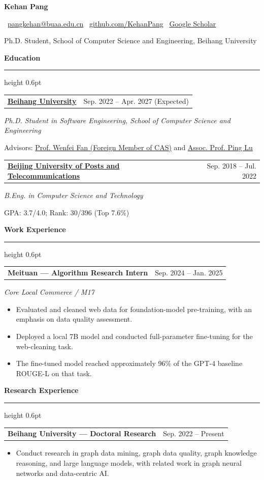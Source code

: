 \documentclass[10pt,a4paper]{article}
\makeatletter
\newcommand{\dateRange}[2]{\textcolor{muted}{#1 -- #2}}
\newcommand{\datedline}[2]{%
  \begin{tabularx}{\textwidth}{@{}Xr@{}}
    \textbf{#1} & #2
  \end{tabularx}\vspace{0.05em}
}
\newcommand{\logosection}[2]{%
  \vspace{0.7em}
  {\large\bfseries\color{heading}\makebox[1.35em][c]{#1}\hspace{0.25em}#2}\par
  \vspace{0.18em}
  {\color{rulecolor}\hrule height 0.6pt}
  \vspace{0.38em}
}
\newcommand{\roleline}[1]{\textit{#1}\par}
\makeatother
\begin{document}
\begin{center}
  {\fontsize{25}{29}\selectfont\bfseries\color{heading} Kehan Pang}\par
  \vspace{0.25em}
  {\small
    \faEnvelope\ \href{mailto:pangkehan@buaa.edu.cn}{pangkehan@buaa.edu.cn}
    \quad
    \faGithub\ \href{https://github.com/KehanPang}{github.com/KehanPang}
    \quad
    \faGraduationCap\ \href{https://scholar.google.com/citations?user=b3XVG_oAAAAJ}{Google Scholar}
  }\par
  \vspace{0.35em}
  Ph.D. Student, School of Computer Science and Engineering, Beihang University
\end{center}

\logosection{\faGraduationCap}{Education}

\datedline{\href{https://ev.buaa.edu.cn/}{Beihang University}}{\dateRange{Sep. 2022}{Apr. 2027 (Expected)}}
\roleline{Ph.D. Student in Software Engineering, School of Computer Science and Engineering}
Advisors: \href{https://cs.pku.edu.cn/info/1008/2707.htm}{Prof. Wenfei Fan (Foreign Member of CAS)} and
\href{https://scse.buaa.edu.cn/info/1388/10436.htm}{Assoc. Prof. Ping Lu}

\vspace{0.45em}
\datedline{\href{https://english.bupt.edu.cn/}{Beijing University of Posts and Telecommunications}}{\dateRange{Sep. 2018}{Jul. 2022}}
\roleline{B.Eng. in Computer Science and Technology}
GPA: 3.7/4.0; Rank: 30/396 (Top 7.6\%)

\logosection{\faBriefcase}{Work Experience}

\datedline{Meituan — Algorithm Research Intern}{\dateRange{Sep. 2024}{Jan. 2025}}
\roleline{Core Local Commerce / M17}
\begin{itemize}
  \item Evaluated and cleaned web data for foundation-model pre-training, with an emphasis on data quality assessment.
  \item Deployed a local 7B model and conducted full-parameter fine-tuning for the web-cleaning task.
  \item The fine-tuned model reached approximately 96\% of the GPT-4 baseline ROUGE-L on that task.
\end{itemize}

\logosection{\faFlask}{Research Experience}

\datedline{Beihang University — Doctoral Research}{\dateRange{Sep. 2022}{Present}}
\begin{itemize}
  \item Conduct research in graph data mining, graph data quality, graph knowledge reasoning, and large language models, with related work in graph neural networks and data-centric AI.
\end{itemize}
\end{document}
